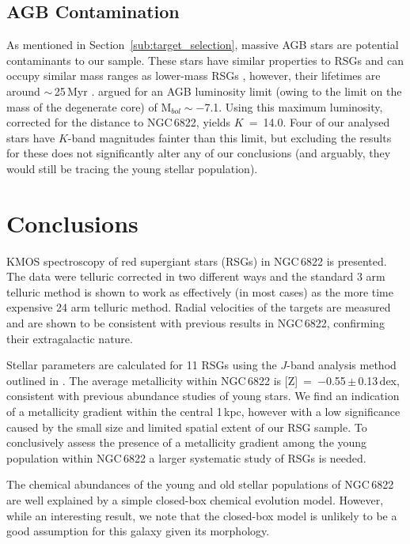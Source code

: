 \subsection{AGB Contamination} %
\label{sub:AGB_contamination}
As mentioned in Section~\ref{sub:target_selection}, massive AGB stars are potential contaminants to our sample.
These stars have similar properties to RSGs and can occupy similar mass ranges as lower-mass RSGs
\citep{2005ARA&A..43..435H},
however, their lifetimes are around $\sim$\,25\,Myr
\citep{2010MNRAS.401.1453D}.
\cite{1983ApJ...272...99W} argued for an AGB luminosity limit
(owing to the limit on the mass of the degenerate core) of M$_{bol}\sim -$7.1.
Using this maximum luminosity, corrected for the distance to NGC\,6822,
yields $K$~=~14.0.
Four of our analysed stars have $K$-band magnitudes fainter than this limit,
but excluding the results for these does not significantly alter any of our conclusions
(and arguably, they would still be tracing the young stellar population).


\section{Conclusions} %
\label{sec:ngc6822conc}

KMOS spectroscopy of red supergiant stars (RSGs) in NGC\,6822 is presented.
The data were telluric corrected in two different ways and the standard 3 arm telluric method is shown to work as effectively (in most cases) as the more time expensive 24 arm telluric method.
Radial velocities of the targets are measured and are shown to be consistent with previous results in NGC\,6822, confirming their extragalactic nature.

Stellar parameters are calculated for 11 RSGs using the $J$-band analysis method outlined in
\cite{2010MNRAS.407.1203D}.
The average metallicity within NGC\,6822 is
[Z]~=~$-$0.55\,$\pm$\,0.13\,dex,
consistent with previous abundance studies of young stars.
We find an indication of a metallicity gradient within the central 1\,kpc,
however with a low significance caused by the small size and limited spatial extent of our RSG sample.
To conclusively assess the presence of a metallicity gradient among the young population within NGC\,6822 a larger systematic study of RSGs is needed.

The chemical abundances of the young and old stellar populations of NGC\,6822 are well explained by a simple closed-box chemical evolution model.
However, while an interesting result, we note that the closed-box model is unlikely to be a good assumption for this galaxy given its morphology.

